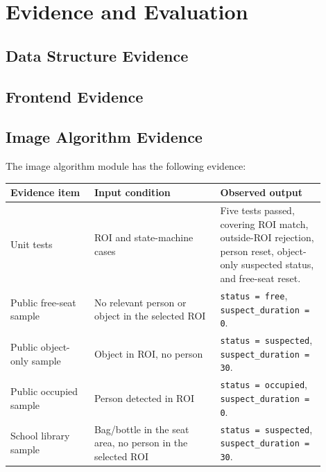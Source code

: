 \section{Evidence and Evaluation}

\subsection{Data Structure Evidence}


\subsection{Frontend Evidence}


\subsection{Image Algorithm Evidence}

The image algorithm module has the following evidence:

\begin{longtable}{|p{0.24\linewidth}|p{0.36\linewidth}|p{0.30\linewidth}|}
\hline
\textbf{Evidence item} & \textbf{Input condition} & \textbf{Observed output} \\
\hline
Unit tests & ROI and state-machine cases & Five tests passed, covering ROI match, outside-ROI rejection, person reset, object-only suspected status, and free-seat reset. \\
\hline
Public free-seat sample & No relevant person or object in the selected ROI & \texttt{status = free}, \texttt{suspect\_duration = 0}. \\
\hline
Public object-only sample & Object in ROI, no person & \texttt{status = suspected}, \texttt{suspect\_duration = 30}. \\
\hline
Public occupied sample & Person detected in ROI & \texttt{status = occupied}, \texttt{suspect\_duration = 0}. \\
\hline
School library sample & Bag/bottle in the seat area, no person in the selected ROI & \texttt{status = suspected}, \texttt{suspect\_duration = 30}. \\
\hline
\end{longtable}


